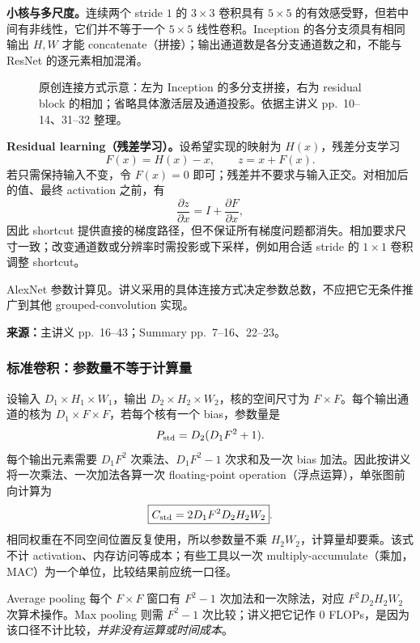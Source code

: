 \textbf{小核与多尺度。}连续两个 stride $1$ 的 $3\times3$ 卷积具有 $5\times5$ 的有效感受野，但若中间有非线性，它们并不等于一个 $5\times5$ 线性卷积。Inception 的各分支须具有相同输出 $H,W$ 才能 concatenate（拼接）；输出通道数是各分支通道数之和，不能与 ResNet 的逐元素相加混淆。

\begin{figure}[htbp]
  \centering
  
  \caption{原创连接方式示意：左为 Inception 的多分支拼接，右为 residual block 的相加；省略具体激活层及通道投影。依据主讲义 pp.~10--14、31--32 整理。}
  \label{fig:sc4001-l07-connections}
\end{figure}

\textbf{Residual learning（残差学习）。}设希望实现的映射为 $H(x)$，残差分支学习
\[
  F(x)=H(x)-x,\qquad z=x+F(x).
\]
若只需保持输入不变，令 $F(x)=0$ 即可；残差并不要求与输入正交。对相加后的值、最终 activation 之前，有
\[
  \frac{\partial z}{\partial x}=I+\frac{\partial F}{\partial x},
\]
因此 shortcut 提供直接的梯度路径，但不保证所有梯度问题都消失。相加要求尺寸一致；改变通道数或分辨率时需投影或下采样，例如用合适 stride 的 $1\times1$ 卷积调整 shortcut。

AlexNet 参数计算见。讲义采用的具体连接方式决定参数总数，不应把它无条件推广到其他 grouped-convolution 实现。


\textbf{来源：}主讲义 pp.~16--43；Summary pp.~7--16、22--23。

\subsubsection{标准卷积：参数量不等于计算量}

设输入 $D_1\times H_1\times W_1$，输出 $D_2\times H_2\times W_2$，核的空间尺寸为 $F\times F$。每个输出通道的核为 $D_1\times F\times F$，若每个核有一个 bias，参数量是
\[
  P_{\rm std}=D_2(D_1F^2+1).
\]
每个输出元素需要 $D_1F^2$ 次乘法、$D_1F^2-1$ 次求和及一次 bias 加法。因此按讲义将一次乘法、一次加法各算一次 floating-point operation（浮点运算），单张图前向计算为
\[
  \boxed{C_{\rm std}=2D_1F^2D_2H_2W_2}.
\]
相同权重在不同空间位置反复使用，所以参数量不乘 $H_2W_2$，计算量却要乘。该式不计 activation、内存访问等成本；有些工具以一次 multiply-accumulate（乘加，MAC）为一个单位，比较结果前应统一口径。

Average pooling 每个 $F\times F$ 窗口有 $F^2-1$ 次加法和一次除法，对应 $F^2D_2H_2W_2$ 次算术操作。Max pooling 则需 $F^2-1$ 次比较；讲义把它记作 $0$ FLOPs，是因为该口径不计比较，\emph{并非没有运算或时间成本}。

